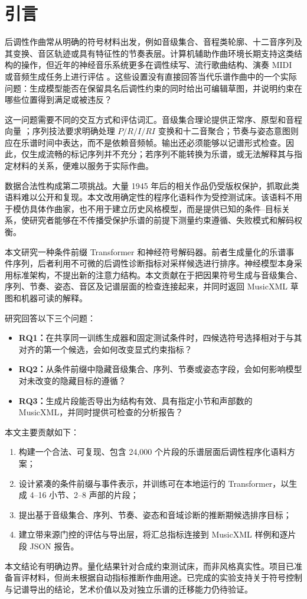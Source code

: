 \section{引言}
\label{sec:introduction-zh}

后调性作曲常从明确的符号材料出发，例如音级集合、音程类轮廓、十二音序列及其变换、音区轨迹或具有特征性的节奏表层。计算机辅助作曲环境长期支持这类结构的操作，但近年的神经音乐系统更多在调性续写、流行歌曲结构、演奏 MIDI 或音频生成任务上进行评估 \citep{assayag1999openmusic,briot2020deep}。这些设置没有直接回答当代乐谱作曲中的一个实际问题：生成模型能否在保留具名后调性约束的同时给出可编辑草图，并说明约束在哪些位置得到满足或被违反？

这一问题需要不同的交互方式和评估词汇。音级集合理论提供正常序、原型和音程向量 \citep{forte1973structure,straus2016posttonal}；序列技法要求明确处理 $P/R/I/RI$ 变换和十二音聚合；节奏与姿态意图则应在乐谱时间中表达，而不是依赖音频帧。输出还必须能够以记谱形式检查。因此，仅生成流畅的标记序列并不充分；若序列不能转换为乐谱，或无法解释其与指定材料的关系，便难以服务于实际作曲。

数据合法性构成第二项挑战。大量 1945 年后的相关作品仍受版权保护，抓取此类语料难以公开和复现。本文改用确定性的程序化语料作为受控测试床。该语料不用于模仿具体作曲家，也不用于建立历史风格模型，而是提供已知的条件--目标关系，使研究者能够在不传播受保护乐谱的前提下测量约束遵循、失败模式和解码权衡。

本文研究一种条件前缀 Transformer 和神经符号解码器。前者生成量化的乐谱事件序列，后者利用不可微的后调性诊断指标对采样候选进行排序。神经模型本身采用标准架构，不提出新的注意力结构。本文贡献在于把因果符号生成与音级集合、序列、节奏、姿态、音区及记谱层面的检查连接起来，并同时返回 MusicXML 草图和机器可读的解释。

研究回答以下三个问题：
\begin{itemize}
  \item \textbf{RQ1：}在共享同一训练生成器和固定测试条件时，四候选符号选择相对于与其对齐的第一个候选，会如何改变显式约束指标？
  \item \textbf{RQ2：}从条件前缀中隐藏音级集合、序列、节奏或姿态字段，会如何影响模型对未改变的隐藏目标的遵循？
  \item \textbf{RQ3：}生成片段能否导出为结构有效、具有指定小节和声部数的 MusicXML，并同时提供可检查的分析报告？
\end{itemize}

本文主要贡献如下：
\begin{enumerate}
  \item 构建一个合法、可复现、包含 24,000 个片段的乐谱层面后调性程序化语料方案；
  \item 设计紧凑的条件前缀与事件表示，并训练可在本地运行的 Transformer，以生成 4--16 小节、2--8 声部的片段；
  \item 提出基于音级集合、序列、节奏、姿态和音域诊断的推断期候选排序目标；
  \item 建立带来源门控的评估与导出层，将汇总指标连接到 MusicXML 样例和逐片段 JSON 报告。
\end{enumerate}

本文结论有明确边界。量化结果针对合成约束测试床，而非风格真实性。项目已准备盲评材料，但尚未根据自动指标推断作曲用途。已完成的实验支持关于符号控制与记谱导出的结论，艺术价值以及对独立乐谱的迁移能力仍待验证。
